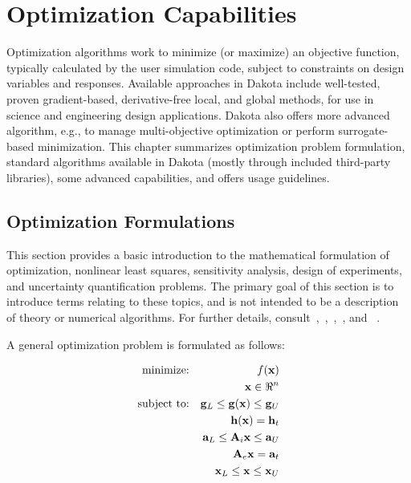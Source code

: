\chapter{Optimization Capabilities}\label{opt}

Optimization algorithms work to minimize (or maximize) an objective
function, typically calculated by the user simulation code, subject to
constraints on design variables and responses.  Available approaches
in Dakota include well-tested, proven gradient-based, derivative-free
local, and global methods, for use in science and engineering design
applications.  Dakota also offers more advanced algorithm, e.g., to
manage multi-objective optimization or perform surrogate-based minimization.
This chapter summarizes optimization problem formulation, standard
algorithms available in Dakota (mostly through included third-party
libraries), some advanced capabilities, and offers usage guidelines.

\section{Optimization Formulations}\label{opt:formulations}

This section provides a basic introduction to the mathematical
formulation of optimization, nonlinear least squares, sensitivity
analysis, design of experiments, and uncertainty quantification
problems. The primary goal of this section is to introduce terms
relating to these topics, and is not intended to be a description of
theory or numerical algorithms. For further details,
consult~\cite{Aro89},~\cite{Gil81},~\cite{Haf92},~\cite{Noc99}, and
~\cite{Van84}.

A general optimization problem is formulated as follows:

\begin{eqnarray}
  \hbox{minimize:} & & f(\mathbf{x})\nonumber\\
  & & \mathbf{x} \in \Re^{n}\nonumber\\
  \hbox{subject to:} & &
  \mathbf{g}_{L} \leq \mathbf{g(x)} \leq \mathbf{g}_U\nonumber\\
  & & \mathbf{h(x)}=\mathbf{h}_{t}\label{opt:equation01}\\
  & & \mathbf{a}_{L} \leq \mathbf{A}_i\mathbf{x} \leq
  \mathbf{a}_U\nonumber\\
  & & \mathbf{A}_{e}\mathbf{x}=\mathbf{a}_{t}\nonumber\\
  & & \mathbf{x}_{L} \leq \mathbf{x} \leq \mathbf{x}_U\nonumber
\end{eqnarray}

